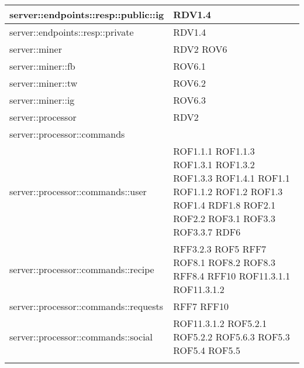 \begin{center}
\begin{longtable}{| p{9cm} | p{4cm} |}
\hline
server::endpoints::resp::public::ig  &  RDV1.4 \\
\hline
server::endpoints::resp::private  &  RDV1.4 \\
\hline
server::miner  & RDV2 \newline ROV6 \\
\hline
server::miner::fb  &  ROV6.1 \\
\hline
server::miner::tw  &  ROV6.2 \\
\hline
server::miner::ig  &  ROV6.3 \\
\hline
server::processor  & RDV2 \\
\hline
server::processor::commands  &  \\
\hline
server::processor::commands::user  & ROF1.1.1 \newline ROF1.1.3 \newline ROF1.3.1 \newline ROF1.3.2 \newline ROF1.3.3 \newline ROF1.4.1 \newline ROF1.1 \newline ROF1.1.2 \newline ROF1.2 \newline ROF1.3 \newline ROF1.4 \newline RDF1.8 \newline ROF2.1 \newline ROF2.2 \newline ROF3.1 \newline ROF3.3 \newline ROF3.3.7 \newline RDF6 \\
\hline
server::processor::commands::recipe  &  RFF3.2.3 \newline ROF5 \newline RFF7 \newline ROF8.1 \newline ROF8.2 \newline ROF8.3 \newline RFF8.4 \newline RFF10 \newline ROF11.3.1.1 \newline ROF11.3.1.2 \\
\hline
server::processor::commands::requests  & RFF7 \newline RFF10 \\
\hline
server::processor::commands::social  &  ROF11.3.1.2 \newline ROF5.2.1 \newline ROF5.2.2 \newline ROF5.6.3 \newline ROF5.3 \newline ROF5.4 \newline ROF5.5 \\
\hline \\
\hline
\end{longtable}
\egroup
\end{center}
